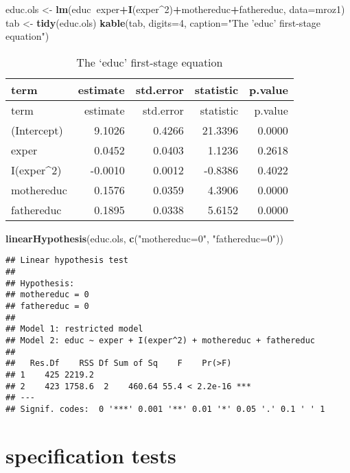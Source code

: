 \documentclass[
]{article}
\newenvironment{Shaded}{\begin{snugshade}}{\end{snugshade}}
\newcommand{\DataTypeTok}[1]{\textcolor[rgb]{0.13,0.29,0.53}{#1}}
\newcommand{\DecValTok}[1]{\textcolor[rgb]{0.00,0.00,0.81}{#1}}
\newcommand{\KeywordTok}[1]{\textcolor[rgb]{0.13,0.29,0.53}{\textbf{#1}}}
\newcommand{\NormalTok}[1]{#1}
\newcommand{\OperatorTok}[1]{\textcolor[rgb]{0.81,0.36,0.00}{\textbf{#1}}}
\newcommand{\StringTok}[1]{\textcolor[rgb]{0.31,0.60,0.02}{#1}}
\begin{document}
\begin{Shaded}
\begin{Highlighting}[]
\NormalTok{educ.ols <-}\StringTok{ }\KeywordTok{lm}\NormalTok{(educ}\OperatorTok{~}\NormalTok{exper}\OperatorTok{+}\KeywordTok{I}\NormalTok{(exper}\OperatorTok{^}\DecValTok{2}\NormalTok{)}\OperatorTok{+}\NormalTok{mothereduc}\OperatorTok{+}\NormalTok{fathereduc, }
               \DataTypeTok{data=}\NormalTok{mroz1)}
\NormalTok{tab <-}\StringTok{ }\KeywordTok{tidy}\NormalTok{(educ.ols)}
\KeywordTok{kable}\NormalTok{(tab, }\DataTypeTok{digits=}\DecValTok{4}\NormalTok{,}
      \DataTypeTok{caption=}\StringTok{"The 'educ' first-stage equation"}\NormalTok{)}
\end{Highlighting}
\end{Shaded}

\begin{longtable}[]{@{}lrrrr@{}}
\caption{The `educ' first-stage equation}\tabularnewline
\toprule
term & estimate & std.error & statistic & p.value\tabularnewline
\midrule
\endfirsthead
\toprule
term & estimate & std.error & statistic & p.value\tabularnewline
\midrule
\endhead
(Intercept) & 9.1026 & 0.4266 & 21.3396 & 0.0000\tabularnewline
exper & 0.0452 & 0.0403 & 1.1236 & 0.2618\tabularnewline
I(exper\^{}2) & -0.0010 & 0.0012 & -0.8386 & 0.4022\tabularnewline
mothereduc & 0.1576 & 0.0359 & 4.3906 & 0.0000\tabularnewline
fathereduc & 0.1895 & 0.0338 & 5.6152 & 0.0000\tabularnewline
\bottomrule
\end{longtable}

\begin{Shaded}
\begin{Highlighting}[]
\KeywordTok{linearHypothesis}\NormalTok{(educ.ols, }\KeywordTok{c}\NormalTok{(}\StringTok{"mothereduc=0"}\NormalTok{, }\StringTok{"fathereduc=0"}\NormalTok{))}
\end{Highlighting}
\end{Shaded}

\begin{verbatim}
## Linear hypothesis test
## 
## Hypothesis:
## mothereduc = 0
## fathereduc = 0
## 
## Model 1: restricted model
## Model 2: educ ~ exper + I(exper^2) + mothereduc + fathereduc
## 
##   Res.Df    RSS Df Sum of Sq    F    Pr(>F)    
## 1    425 2219.2                                
## 2    423 1758.6  2    460.64 55.4 < 2.2e-16 ***
## ---
## Signif. codes:  0 '***' 0.001 '**' 0.01 '*' 0.05 '.' 0.1 ' ' 1
\end{verbatim}

\hypertarget{specification-tests}{%
\section{specification tests}\label{specification-tests}}
\end{document}
